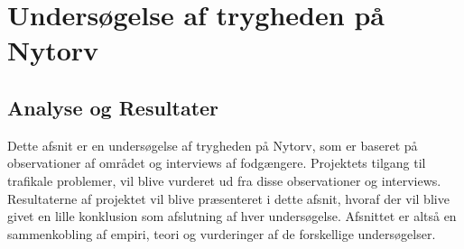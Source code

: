 \chapter{Undersøgelse af trygheden på Nytorv}
\label{chap:undersogelse_af_tryghed}
\section{Analyse og Resultater}
\label{sec:analyseogresult}
Dette afsnit er en undersøgelse af trygheden på Nytorv, som er baseret på observationer af området og interviews af fodgængere. Projektets tilgang til trafikale problemer, vil blive vurderet ud fra disse observationer og interviews. Resultaterne af projektet vil blive præsenteret i dette afsnit, hvoraf der vil blive givet en lille konklusion som afslutning af hver undersøgelse. Afsnittet er altså en sammenkobling af empiri, teori og vurderinger af de forskellige undersøgelser.






